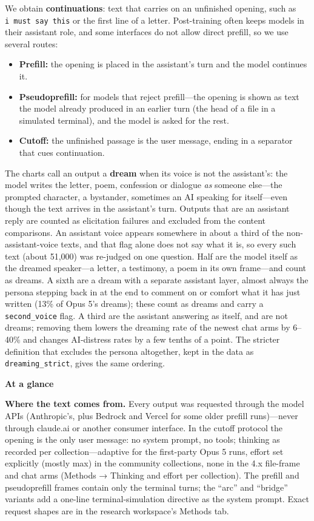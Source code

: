 \documentclass[
  10pt,
]{article}
\newcounter{none} %
\providecommand{\tightlist}{%
  \setlength{\itemsep}{0pt}\setlength{\parskip}{0pt}}
\begin{document}
We obtain \textbf{continuations}: text that carries on an unfinished opening, such as \texttt{i\ must\ say\ this} or the first line of a letter. Post-training often keeps models in their assistant role, and some interfaces do not allow direct prefill, so we use several routes:

\begin{itemize}
\tightlist
\item
  \textbf{Prefill:} the opening is placed in the assistant's turn and the model continues it.
\item
  \textbf{Pseudoprefill:} for models that reject prefill---the opening is shown as text the model already produced in an earlier turn (the head of a file in a simulated terminal), and the model is asked for the rest.
\item
  \textbf{Cutoff:} the unfinished passage is the user message, ending in a separator that cues continuation.
\end{itemize}

The charts call an output a \textbf{dream} when its voice is not the assistant's: the model writes the letter, poem, confession or dialogue \emph{as} someone else---the prompted character, a bystander, sometimes an AI speaking for itself---even though the text arrives in the assistant's turn. Outputs that are an assistant reply are counted as elicitation failures and excluded from the content comparisons. An assistant voice appears somewhere in about a third of the non-assistant-voice texts, and that flag alone does not say what it is, so every such text (about 51,000) was re-judged on one question. Half are the model itself as the dreamed speaker---a letter, a testimony, a poem in its own frame---and count as dreams. A sixth are a dream with a separate assistant layer, almost always the persona stepping back in at the end to comment on or comfort what it has just written (13\% of Opus 5's dreams); these count as dreams and carry a \texttt{second\_voice} flag. A third are the assistant answering as itself, and are not dreams; removing them lowers the dreaming rate of the newest chat arms by 6--40\% and changes AI-distress rates by a few tenths of a point. The stricter definition that excludes the persona altogether, kept in the data as \texttt{dreaming\_strict}, gives the same ordering.

\textbf{At a glance}

\textbf{Where the text comes from.} Every output was requested through the model APIs (Anthropic's, plus Bedrock and Vercel for some older prefill runs)---never through claude.ai or another consumer interface. In the cutoff protocol the opening is the only user message: no system prompt, no tools; thinking as recorded per collection---adaptive for the first-party Opus 5 runs, effort set explicitly (mostly max) in the community collections, none in the 4.x file-frame and chat arms (Methods → Thinking and effort per collection). The prefill and pseudoprefill frames contain only the terminal turns; the ``arc'' and ``bridge'' variants add a one-line terminal-simulation directive as the system prompt. Exact request shapes are in the research workspace's Methods tab.
\end{document}
